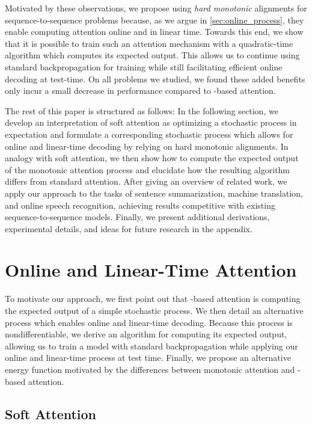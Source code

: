 \documentclass{article}
\begin{document}
Motivated by these observations, we propose using \textit{hard monotonic} alignments for sequence-to-sequence problems because, as we argue in \cref{sec:online_process}, they enable computing attention online and in linear time.
Towards this end, we show that it is possible to train such an attention mechanism with a quadratic-time algorithm which computes its expected output.
This allows us to continue using standard backpropagation for training while still facilitating efficient online decoding at test-time.
On all problems we studied, we found these added benefits only incur a small decrease in performance compared to -based attention.

The rest of this paper is structured as follows:
In the following section, we develop an interpretation of soft attention as optimizing a stochastic process in expectation and formulate a corresponding stochastic process which allows for online and linear-time decoding by relying on hard monotonic alignments.
In analogy with soft attention, we then show how to compute the expected output of the monotonic attention process and elucidate how the resulting algorithm differs from standard  attention.
After giving an overview of related work, we apply our approach to the tasks of sentence summarization, machine translation, and online speech recognition, achieving results competitive with existing sequence-to-sequence models.
Finally, we present additional derivations, experimental details, and ideas for future research in the appendix.

\section{Online and Linear-Time Attention}

To motivate our approach, we first point out that -based attention is computing the expected output of a simple stochastic process.
We then detail an alternative process which enables online and linear-time decoding.
Because this process is nondifferentiable, we derive an algorithm for computing its expected output, allowing us to train a model with standard backpropagation while applying our online and linear-time process at test time.
Finally, we propose an alternative energy function motivated by the differences between monotonic attention and -based attention.

\subsection{Soft Attention}
\end{document}
